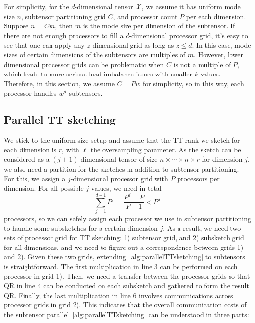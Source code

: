 \documentclass[11pt,a4paper,review]{siamart220329}
\begin{document}
For simplicity, for the $d$-dimensional tensor $\mathcal{X}$, we assume it has uniform mode size $n$, subtensor partitioning grid $C$, and processor count $P$ per each dimension. Suppose $n = Cm$, then $m$ is the mode size per dimension of the subtensor. If there are not enough processors to fill a $d$-dimensional processor grid, it's easy to see that one can apply any $z$-dimensional grid as long as $z \le d$. In this case, mode sizes of certain dimensions of the subtensors are multiples of $m$. However, lower dimensional processor grids can be problematic when $C$ is not a multiple of $P$, which leads to more serious load imbalance issues with smaller $k$ values. Therefore, in this section, we assume $C=Pw$ for simplicity, so in this way, each processor handles $w^d$ subtensors.

\subsection{Parallel TT sketching}
We stick to the uniform size setup and assume that the TT rank we sketch for each dimension is $r$, with $\ell$ the oversampling parameter. As the sketch can be considered as a $(j+1)$-dimensional tensor of size $n \times \cdots \times n \times r$ for dimension $j$, we also need a partition for the sketches in addition to subtensor partitioning. For this, we assign a $j$-dimensional processor grid with $P$ processors per dimension. For all possible $j$ values, we need in total
\[ \sum_{j=1}^{d-1} P^j = \frac{P^d-P}{P-1} < P^d \]
processors, so we can safely assign each processor we use in subtensor partitioning to handle some subsketches for a certain dimension $j$. As a result, we need two sets of processor grid for TT sketching: 1) subtensor grid, and 2) subsketch grid for all dimensions, and we need to figure out a correspondence between grids 1) and 2). Given these two grids, extending~\cref{alg:parallelTTsketching} to subtensors is straightforward. The first multiplication in line 3 can be performed on each processor in grid 1). Then, we need a transfer between the processor grids so that QR in line 4 can be conducted on each subsketch and gathered to form the result QR. Finally, the last multiplication in line 6 involves communications across processor grids in grid 2). This indicates that the overall communication costs of the subtensor parallel~\cref{alg:parallelTTsketching} can be understood in three parts:
\end{document}
